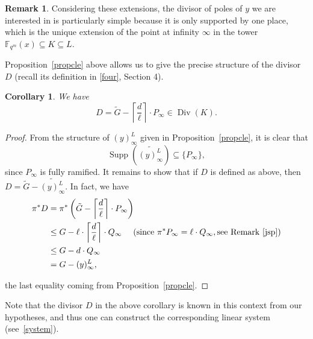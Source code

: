 \documentclass[10pt]{article}
\newtheorem{coro1}[thm]{Corollary}
\theoremstyle{definition}
\newtheorem{rq1}[thm]{Remark}
\theoremstyle{definition}
\theoremstyle{definition}
\newcommand{\s}{\vspace{0.3cm}}
\newcommand{\cd}{\cdot}
\newcommand{\fqm}{\mathbb{F}_{q^m}}
\newcommand{\su}{\subseteq}
\newcommand{\Div}{\operatorname{Div}}
\newcommand{\Supp}{\operatorname{Supp}}
\begin{document}
\s

\begin{rq1} Considering these extensions, the divisor of poles of $y$ we are interested in is particularly simple because it is only supported by one place, which is the unique extension of the point at infinity $\infty$ in the tower $\fqm(x) \su K \su L$.
\end{rq1}

\s

Proposition~\ref{propcle} above allows us to give the precise structure of the divisor $D$ (recall its definition in \eqref{four}, Section 4).

\s

\begin{coro1} \label{diviseurDKummer}
We have
\[D = \tilde{G} - \left\lceil\frac{d}{\ell}\right\rceil \cd P_{\infty} \in \Div(K).\]
\end{coro1}

\s

\begin{proof}
From the structure of $(y)^L_{\infty}$ given in Proposition~\ref{propcle}, it is clear that 
\[\Supp\left(\widetilde{(y)^L_{\infty}}\right) \su \{P_{\infty}\},\]
since $P_{\infty}$ is fully ramified. 
It remains to show that if $D$ is defined as above, then $D = \tilde{G} - \widetilde{(y)^L_{\infty}}$. In fact, we have
\begin{align*}
\pi^*D &= \pi^* \left(\tilde{G} - \left\lceil\frac{d}{\ell}\right\rceil \cd P_{\infty}\right) \\
&\leq G - \ell \cd \left\lceil\frac{d}{\ell}\right\rceil \cd Q_{\infty} \ \quad (\textrm{since} \ \pi^*P_{\infty} = \ell \cd Q_{\infty}, \mathrm{see \ Remark~\ref{jsp}}) \\
& \leq G - d \cd Q_{\infty} \\
&= G-(y)^L_{\infty},
\end{align*}

the last equality coming from Proposition~\ref{propcle}. 
\end{proof}

\s

Note that the divisor $D$ in the above corollary is known in this context from our hypotheses, and thus one can construct the corresponding linear system (see~\eqref{system}).

\s
\end{document}
